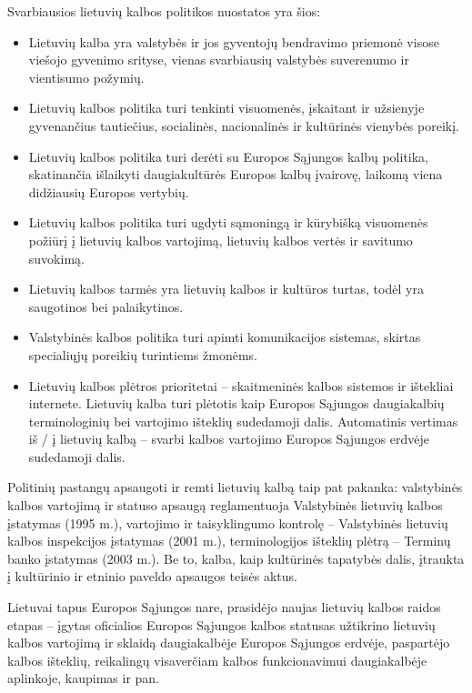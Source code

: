\documentclass[]{../metanetpaper}
\begin{document}
\begin{multicols}{2}
    Svarbiausios lietuvių kalbos politikos nuostatos yra šios:   
  \begin{itemize}
      \item Lietuvių kalba yra valstybės ir jos gyventojų bendravimo priemonė visose viešojo gyvenimo srityse, vienas svarbiausių valstybės suverenumo ir vientisumo požymių.
      \item Lietuvių kalbos politika turi tenkinti visuomenės, įskaitant ir užsienyje gyvenančius tautiečius, socialinės, nacionalinės ir kultūrinės vienybės poreikį.
      \item Lietuvių kalbos politika turi derėti su Europos Sąjungos kalbų politika, skatinančia išlaikyti daugiakultūrės Europos kalbų įvairovę, laikomą viena didžiausių Europos vertybių.
      \item Lietuvių kalbos politika turi ugdyti sąmoningą ir kūrybišką visuomenės požiūrį į lietuvių kalbos vartojimą, lietuvių kalbos vertės ir savitumo suvokimą.
      \item Lietuvių kalbos tarmės yra lietuvių kalbos ir kultūros turtas, todėl yra saugotinos bei palaikytinos.
       \item Valstybinės kalbos politika turi apimti komunikacijos sistemas, skirtas specialiųjų poreikių turintiems žmonėms.
      \item Lietuvių kalbos plėtros prioritetai – skaitmeninės kalbos sistemos ir ištekliai internete. Lietuvių kalba turi plėtotis kaip Europos Sąjungos daugiakalbių terminologinių bei vartojimo išteklių sudedamoji dalis. Automatinis vertimas iš / į lietuvių kalbą – svarbi kalbos vartojimo Europos Sąjungos erdvėje sudedamoji dalis.
    \end{itemize}

    Politinių pastangų apsaugoti ir remti lietuvių kalbą taip pat pakanka: valstybinės kalbos vartojimą ir statuso apsaugą reglamentuoja Valstybinės lietuvių kalbos įstatymas (1995 m.), vartojimo ir taisyklingumo kontrolę – Valstybinės lietuvių kalbos inspekcijos įstatymas (2001 m.), terminologijos išteklių plėtrą – Terminų banko įstatymas (2003 m.). Be to, kalba, kaip kultūrinės tapatybės dalis, įtraukta į kultūrinio ir etninio paveldo apsaugos teisės aktus.   


 Lietuvai tapus Europos Sąjungos nare, prasidėjo naujas lietuvių kalbos raidos etapas – įgytas oficialios Europos Sąjungos kalbos statusas užtikrino lietuvių kalbos vartojimą ir sklaidą daugiakalbėje Europos Sąjungos erdvėje, paspartėjo kalbos išteklių, reikalingų visaverčiam kalbos funkcionavimui daugiakalbėje aplinkoje, kaupimas ir pan.   


\end{multicols}
\end{document}
